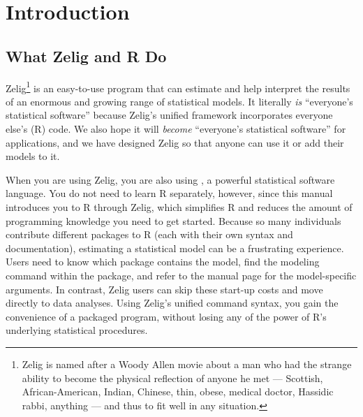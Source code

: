 \chapter{Introduction}

\section{What Zelig and R Do}

Zelig\footnote{Zelig is named after a Woody Allen movie about a man
  who had the strange ability to become the physical reflection of
  anyone he met --- Scottish, African-American, Indian, Chinese, thin,
  obese, medical doctor, Hassidic rabbi, anything --- and thus to fit
  well in any situation.} is an easy-to-use program that can estimate
and help interpret the results of an enormous and growing range of
statistical models.  It literally \emph{is} ``everyone's statistical
software'' because Zelig's unified framework incorporates everyone
else's (R) code.  We also hope it will \emph{become} ``everyone's
statistical software'' for applications, and we have designed Zelig so
that anyone can use it or add their models to it.

When you are using Zelig, you are also using
, a powerful statistical software
language.  You do not need to learn R separately, however, since this
manual introduces you to R through Zelig, which simplifies
R and reduces the amount of programming knowledge you need to
get started.  Because so many individuals contribute different
packages to R (each with their own syntax and documentation),
estimating a statistical model can be a frustrating experience.  Users
need to know which package contains the model, find the modeling
command within the package, and refer to the manual page for the
model-specific arguments.  In contrast, Zelig users can skip these
start-up costs and move directly to data analyses.  Using Zelig's
unified command syntax, you gain the convenience of a packaged
program, without losing any of the power of R's underlying statistical
procedures.

